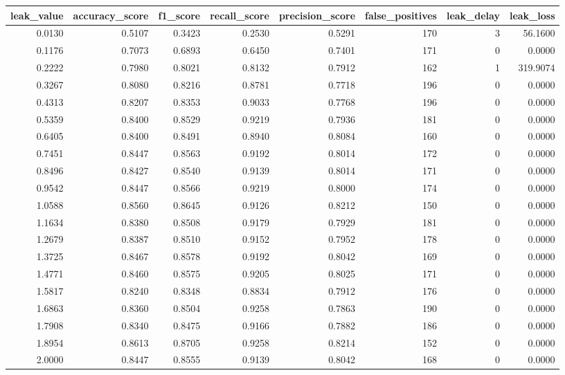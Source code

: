 \begin{tabular}{rrrrrrrr}
\toprule
leak\_value & accuracy\_score & f1\_score & recall\_score & precision\_score & false\_positives & leak\_delay & leak\_loss \\
\midrule
0.0130 & 0.5107 & 0.3423 & 0.2530 & 0.5291 & 170 & 3 & 56.1600 \\
0.1176 & 0.7073 & 0.6893 & 0.6450 & 0.7401 & 171 & 0 & 0.0000 \\
0.2222 & 0.7980 & 0.8021 & 0.8132 & 0.7912 & 162 & 1 & 319.9074 \\
0.3267 & 0.8080 & 0.8216 & 0.8781 & 0.7718 & 196 & 0 & 0.0000 \\
0.4313 & 0.8207 & 0.8353 & 0.9033 & 0.7768 & 196 & 0 & 0.0000 \\
0.5359 & 0.8400 & 0.8529 & 0.9219 & 0.7936 & 181 & 0 & 0.0000 \\
0.6405 & 0.8400 & 0.8491 & 0.8940 & 0.8084 & 160 & 0 & 0.0000 \\
0.7451 & 0.8447 & 0.8563 & 0.9192 & 0.8014 & 172 & 0 & 0.0000 \\
0.8496 & 0.8427 & 0.8540 & 0.9139 & 0.8014 & 171 & 0 & 0.0000 \\
0.9542 & 0.8447 & 0.8566 & 0.9219 & 0.8000 & 174 & 0 & 0.0000 \\
1.0588 & 0.8560 & 0.8645 & 0.9126 & 0.8212 & 150 & 0 & 0.0000 \\
1.1634 & 0.8380 & 0.8508 & 0.9179 & 0.7929 & 181 & 0 & 0.0000 \\
1.2679 & 0.8387 & 0.8510 & 0.9152 & 0.7952 & 178 & 0 & 0.0000 \\
1.3725 & 0.8467 & 0.8578 & 0.9192 & 0.8042 & 169 & 0 & 0.0000 \\
1.4771 & 0.8460 & 0.8575 & 0.9205 & 0.8025 & 171 & 0 & 0.0000 \\
1.5817 & 0.8240 & 0.8348 & 0.8834 & 0.7912 & 176 & 0 & 0.0000 \\
1.6863 & 0.8360 & 0.8504 & 0.9258 & 0.7863 & 190 & 0 & 0.0000 \\
1.7908 & 0.8340 & 0.8475 & 0.9166 & 0.7882 & 186 & 0 & 0.0000 \\
1.8954 & 0.8613 & 0.8705 & 0.9258 & 0.8214 & 152 & 0 & 0.0000 \\
2.0000 & 0.8447 & 0.8555 & 0.9139 & 0.8042 & 168 & 0 & 0.0000 \\
\bottomrule
\end{tabular}
